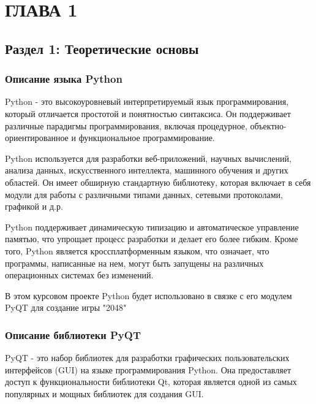 \chapter{\label{ch:ch01}ГЛАВА 1} %

\section{\label{sec:ch01/sec01}Раздел 1: Теоретические основы}
\subsection{\label{subsec:ch01/sec01/sub01}Описание языка Python}

Python - это высокоуровневый интерпретируемый язык программирования, который отличается простотой и понятностью синтаксиса. Он поддерживает различные парадигмы программирования, включая процедурное, объектно-ориентированное и функциональное программирование.

Python используется для разработки веб-приложений, научных вычислений, анализа данных, искусственного интеллекта, машинного обучения и других областей. Он имеет обширную стандартную библиотеку, которая включает в себя модули для работы с различными типами данных, сетевыми протоколами, графикой и д.р.

Python поддерживает динамическую типизацию и автоматическое управление памятью, что упрощает процесс разработки и делает его более гибким. Кроме того, Python является кроссплатформенным языком, что означает, что программы, написанные на нем, могут быть запущены на различных операционных системах без изменений.

В этом курсовом проекте Python будет использовано в связке с его модулем PyQT для создание игры "2048"

\subsection{\label{subsec:ch01/sec01/sub01}Описание библиотеки PyQT}
PyQT - это набор библиотек для разработки графических пользовательских интерфейсов (GUI) на языке программирования Python. Она предоставляет доступ к функциональности библиотеки Qt, которая является одной из самых популярных и мощных библиотек для создания GUI.

